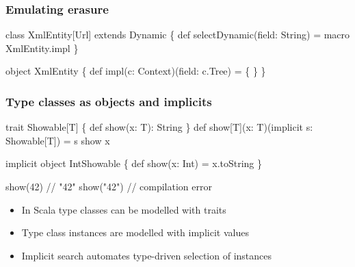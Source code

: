 \documentclass[svgnames,hyperref={bookmarks=false}]{beamer}
\begin{document}
\begin{frame}[fragile]
\frametitle{Emulating erasure}

\begin{semiverbatim}
class XmlEntity[Url] extends Dynamic \{
  def selectDynamic(field: String) = macro XmlEntity.impl
\}

object XmlEntity \{
  def impl(c: Context)(field: c.Tree) = \{
  \}
\}
\end{semiverbatim}
\end{frame}

\begin{frame}[fragile]
\frametitle{}

\vskip40pt
\begin{center}
\end{center}
\end{frame}

\begin{frame}[fragile]
\frametitle{Type classes as objects and implicits}

\begin{semiverbatim}
trait Showable[T] \{ def show(x: T): String \}
def show[T](x: T)(implicit s: Showable[T]) = s show x

implicit object IntShowable \{
  def show(x: Int) = x.toString
\}

show(42) // "42"
show("42") // compilation error

\end{semiverbatim}
\begin{itemize}
\item In Scala type classes can be modelled with traits
\item Type class instances are modelled with implicit values
\item Implicit search automates type-driven selection of instances
\end{itemize}
\end{frame}
\end{document}
